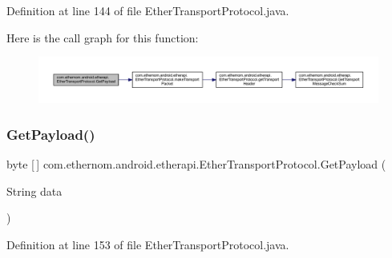 Definition at line 144 of file Ether\+Transport\+Protocol.\+java.

Here is the call graph for this function\+:\nopagebreak
\begin{figure}[H]
\begin{center}
\leavevmode
\includegraphics[width=350pt]{classcom_1_1ethernom_1_1android_1_1etherapi_1_1_ether_transport_protocol_ac9ecf8d82db8ea4d83bbbf4face710b0_cgraph}
\end{center}
\end{figure}
\mbox{\label{classcom_1_1ethernom_1_1android_1_1etherapi_1_1_ether_transport_protocol_a324ab9afbb188bc0adca15d454b054ae}} 
\subsubsection{\texorpdfstring{Get\+Payload()}{GetPayload()}\hspace{0.1cm}{\footnotesize\ttfamily [3/6]}}
{\footnotesize\ttfamily byte \mbox{[}$\,$\mbox{]} com.\+ethernom.\+android.\+etherapi.\+Ether\+Transport\+Protocol.\+Get\+Payload (\begin{DoxyParamCaption}\item[{String}]{data }\end{DoxyParamCaption})}



Definition at line 153 of file Ether\+Transport\+Protocol.\+java.

